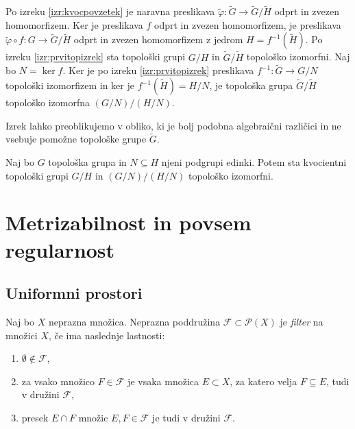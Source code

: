\documentclass[mat1]{fmfdelo}
\begin{document}
\begin{dokaz}
Po izreku \ref{izr:kvocpovzetek} je naravna preslikava $\tilde{\varphi}\colon \widetilde{G} \to \widetilde{G}/\widetilde{H}$ odprt in zvezen homomorfizem. Ker je preslikava $f$ odprt in zvezen homomorfizem, je preslikava $\tilde{\varphi}\circ f\colon G \to \widetilde{G}/\widetilde{H}$ odprt in zvezen homomorfizem z jedrom $H = f^{-1}(\widetilde{H})$. Po izreku \ref{izr:prvitopizrek} sta topološki grupi $G/H$ in $\widetilde{G}/\widetilde{H}$ topološko izomorfni. Naj bo $N = \ker f$. Ker je po izreku \ref{izr:prvitopizrek} preslikava $f^{-1}\colon \widetilde{G} \to G/N$ topološki izomorfizem in ker je $f^{-1}(\widetilde{H}) = H/N$, je topološka grupa $\widetilde{G}/\widetilde{H}$ topološko izomorfna $(G/N)/(H/N)$.
\end{dokaz}

Izrek lahko preoblikujemo v obliko, ki je bolj podobna algebraični različici in ne vsebuje pomožne topološke grupe $\widetilde{G}$.
\begin{izrek}\label{izr:tretjitopizrek}
Naj bo $G$ topološka grupa in $N \subseteq H$ njeni podgrupi edinki. Potem sta kvocientni topološki grupi $G/H$ in $(G/N)/(H/N)$ topološko izomorfni.
\end{izrek}

\section{Metrizabilnost in povsem regularnost}

\subsection{Uniformni prostori}

\begin{definicija}\label{def:uniform}
Naj bo $X$ neprazna množica. Neprazna poddružina $\mathcal{F} \subset \mathcal{P}(X)$ je \emph{filter} na množici $X$, če ima naslednje lastnosti:
\begin{enumerate}
\item $\emptyset \notin \mathcal{F}$,
\item za vsako množico $F \in \mathcal{F}$ je vsaka množica $E \subset X$, za katero velja $F \subseteq E$, tudi v družini $\mathcal{F}$,
\item presek $E \cap F$ množic $E, F \in \mathcal{F}$ je tudi v družini $\mathcal{F}$.
\end{enumerate}
\end{definicija}
\end{document}
